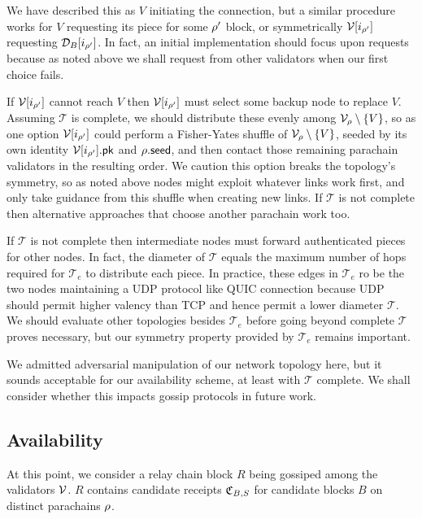 We have described this as $V$ initiating the connection, but a similar procedure works for $V$ requesting its piece for some $\rho'$ block, or symmetrically $\mathcal{V}[i_{\rho'}]$ requesting $\mathcal{D}_B[i_{\rho'}]$.  In fact, an initial implementation should focus upon requests because as noted above we shall request from other validators when our first choice fails. 

If $\mathcal{V}[i_{\rho'}]$ cannot reach $V$ then $\mathcal{V}[i_{\rho'}]$ must select some backup node to replace $V$.  Assuming $\mathcal{T}$ is complete, we should distribute these evenly among $\mathcal{V}_{\rho} \setminus \{V\}$, so as one option $\mathcal{V}[i_{\rho'}]$ could perform a Fisher-Yates shuffle of $\mathcal{V}_{\rho} \setminus \{V\}$, seeded by its own identity $\mathcal{V}[i_{\rho'}].\mathsf{pk}$ and $\rho.\mathsf{seed}$, and then contact those remaining parachain validators in the resulting order.  We caution this option breaks the topology's symmetry, so as noted above nodes might exploit whatever links work first, and only take guidance from this shuffle when creating new links.  If $\mathcal{T}$ is not complete then alternative approaches that choose another parachain work too.  

If $\mathcal{T}$ is not complete then intermediate nodes must forward authenticated pieces for other nodes.  In fact, the diameter of $\mathcal{T}$ equals the maximum number of hops required for $\mathcal{T}_e$ to distribute each piece.  
In practice, these edges in $\mathcal{T}_e$ ro be the two nodes
maintaining a UDP protocol like QUIC connection because UDP should permit higher valency than TCP and hence permit a lower diameter $\mathcal{T}$.  
We should evaluate other topologies besides $\mathcal{T}_e$ before going beyond complete $\mathcal{T}$ proves necessary, but our symmetry property provided by $\mathcal{T}_e$ remains important. 

We admitted adversarial manipulation of our network topology here, but it sounds acceptable for our availability scheme, at least with $\mathcal{T}$ complete.  We shall consider whether this impacts gossip protocols in future work. 


\subsection{Availability}
\label{sec:availability2}  %

At this point, we consider a relay chain block $R$ being gossiped among the validators $\mathcal{V}$.  $R$ contains candidate receipts $\mathfrak{C}_{B,S}$ for candidate blocks $B$ on distinct parachains $\rho$.  

